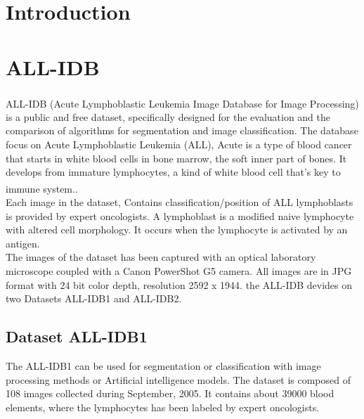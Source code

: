 \section{Introduction}
\hspace*{0.16in}

\section{ALL-IDB}

ALL-IDB (Acute Lymphoblastic Leukemia Image Database for Image Processing) \textsuperscript{\cite{labati2011all}} is a public and free dataset, specifically designed for the evaluation and the comparison of algorithms for segmentation and image classification. The database focus on Acute Lymphoblastic Leukemia (ALL), Acute is a type of blood cancer that starts in white blood cells in bone marrow, the soft inner part of bones. It develops from immature lymphocytes, a kind of white blood cell that’s key to immune system.\textsuperscript{\cite{Annie_Stuart_What_2022_webmd}}.\\

Each image in the dataset, Contains classification/position of ALL lymphoblasts is provided by expert oncologists. A lymphoblast is a modified naive lymphocyte with altered cell morphology. It occurs when the lymphocyte is activated by an antigen.\\

The images of the dataset has been captured with an optical laboratory microscope coupled with a Canon PowerShot G5 camera. All images are in JPG format with 24 bit color depth, resolution 2592 x 1944. the ALL-IDB devides on two Datasets ALL-IDB1 and ALL-IDB2.\\

\subsection{Dataset ALL-IDB1}

The ALL-IDB1 can be used for segmentation or classification with image processing methods or Artificial intelligence models. The dataset is composed of 108 images collected during September, 2005. It contains about 39000 blood elements, where the lymphocytes has been labeled by expert oncologists.

